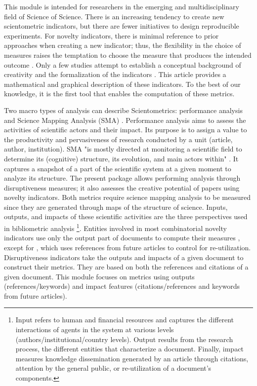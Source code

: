 This module is intended for researchers in the emerging and multidisciplinary field of Science of Science. There is an increasing tendency to create new scientometric indicators, but there are fewer initiatives to design reproducible experiments. For novelty indicators, there is minimal reference to prior approaches when creating a new indicator; thus, the flexibility in the choice of measures raises the temptation to choose the measure that produces the intended outcome \citep{foster2021surprise}. Only a few studies attempt to establish a conceptual background of creativity and the formalization of the indicators \citep{foster2021surprise}. This article provides a mathematical and graphical description of these indicators. To the best of our knowledge, it is the first tool that enables the computation of these metrics.

Two macro types of analysis can describe Scientometrics: performance analysis and Science Mapping Analysis (SMA) \citep{moral2020software}. Performance analysis aims to assess the activities of scientific actors and their impact. Its purpose is to assign a value to the productivity and pervasiveness of research conducted by a unit (article, author, institution). SMA "is mostly directed at monitoring a scientific field to determine its (cognitive) structure, its evolution, and main actors within" \citep{noyons1999integrating}. It captures a snapshot of a part of the scientific system at a given moment to analyze its structure. The present package allows performing analysis through disruptiveness measures; it also assesses the creative potential of papers using novelty indicators. Both metrics require science mapping analysis to be measured since they are generated through maps of the structure of science. Inputs, outputs, and impacts of these scientific activities are the three perspectives used in bibliometric analysis \citep{sugimoto2018measuring}\footnote{\justifying Input refers to human and financial resources and captures the different interactions of agents in the system at various levels (authors/institutional/country levels). Output results from the research process, the different entities that characterize a document. Finally, impact measures knowledge dissemination generated by an article through citations, attention by the general public, or re-utilization of a document's components.}. Entities involved in most combinatorial novelty indicators use only the output part of documents to compute their measures \citep{uzzi2013atypical, foster2015tradition, lee2015creativity, shibayama2021measuring}, except for \cite{wang2017bias}, which uses references from future articles to control for re-utilization. Disruptiveness indicators \citep{wu2019large, bu2019multi, bornmann2020disruptive} take the outputs and impacts of a given document to construct their metrics. They are based on both the references and citations of a given document. This module focuses on metrics using outputs (references/keywords) and impact features (citations/references and keywords from future articles).
 

